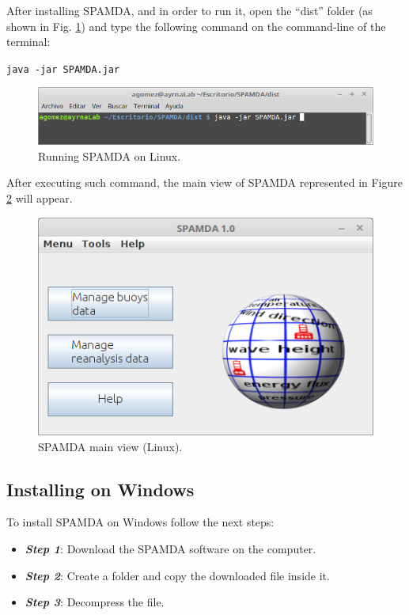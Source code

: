 \begin{onehalfspace}
				After installing SPAMDA, and in order to run it, open the ``dist'' folder (as shown in Fig. \ref{fig:runningSPAMDAonLinux}) and type the following command on the command-line of the terminal:
				
				\texttt{java -jar SPAMDA.jar}
				
				\begin{figure}[ht!]
					\centering
					\includegraphics[scale=0.50]{figures/runningSPAMDAonLinux.png}
					\caption{Running SPAMDA on Linux.}
					\label{fig:runningSPAMDAonLinux}
				\end{figure}
				
				After executing such command, the main view of SPAMDA represented in Figure \ref{fig:SPAMDAmainViewonLinux} will appear.
				
				\begin{figure}[ht!]
					\centering
					\includegraphics[scale=0.50]{figures/mainView.png}
					\caption{SPAMDA main view (Linux).}
					\label{fig:SPAMDAmainViewonLinux}
				\end{figure}

				
			\subsection{Installing on Windows}
			
				To install SPAMDA on Windows follow the next steps:
			
					\begin{itemize}
						\item \textit{\textbf{Step 1}}: Download the SPAMDA software on the computer.
						\item \textit{\textbf{Step 2}}: Create a folder and copy the downloaded file inside it.
						\item \textit{\textbf{Step 3}}: Decompress the file.
					\end{itemize}
					

\end{onehalfspace}
